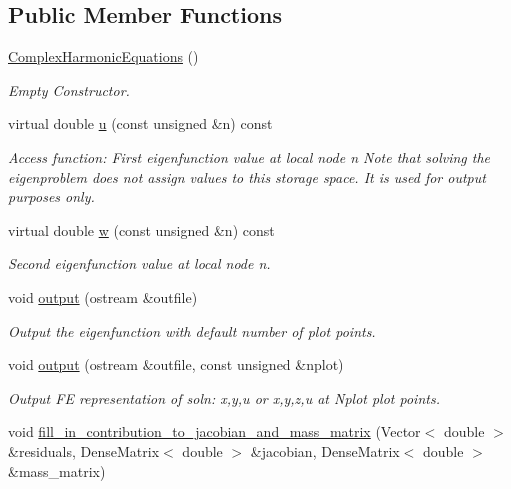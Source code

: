 \subsection*{Public Member Functions}
\begin{DoxyCompactItemize}
\item 
\hyperlink{classComplexHarmonicEquations_aa93feb265f731b0d82c3c1c4c29f183d}{Complex\+Harmonic\+Equations} ()
\begin{DoxyCompactList}\small\item\em Empty Constructor. \end{DoxyCompactList}\item 
virtual double \hyperlink{classComplexHarmonicEquations_af4ff638cb40e23c3574631423fd56bce}{u} (const unsigned \&n) const
\begin{DoxyCompactList}\small\item\em Access function\+: First eigenfunction value at local node n Note that solving the eigenproblem does not assign values to this storage space. It is used for output purposes only. \end{DoxyCompactList}\item 
virtual double \hyperlink{classComplexHarmonicEquations_a9b3955ee987827d831e44eeb43dcae63}{w} (const unsigned \&n) const
\begin{DoxyCompactList}\small\item\em Second eigenfunction value at local node n. \end{DoxyCompactList}\item 
void \hyperlink{classComplexHarmonicEquations_a9185e07b984e735c1c45b6f5a6c02b5f}{output} (ostream \&outfile)
\begin{DoxyCompactList}\small\item\em Output the eigenfunction with default number of plot points. \end{DoxyCompactList}\item 
void \hyperlink{classComplexHarmonicEquations_a141e0a24096323472fcd10138b6fd5fa}{output} (ostream \&outfile, const unsigned \&nplot)
\begin{DoxyCompactList}\small\item\em Output FE representation of soln\+: x,y,u or x,y,z,u at Nplot plot points. \end{DoxyCompactList}\item 
void \hyperlink{classComplexHarmonicEquations_a4c67a0c220f61d6c300703f29c00b1ef}{fill\+\_\+in\+\_\+contribution\+\_\+to\+\_\+jacobian\+\_\+and\+\_\+mass\+\_\+matrix} (Vector$<$ double $>$ \&residuals, Dense\+Matrix$<$ double $>$ \&jacobian, Dense\+Matrix$<$ double $>$ \&mass\+\_\+matrix)

\end{DoxyCompactItemize}

